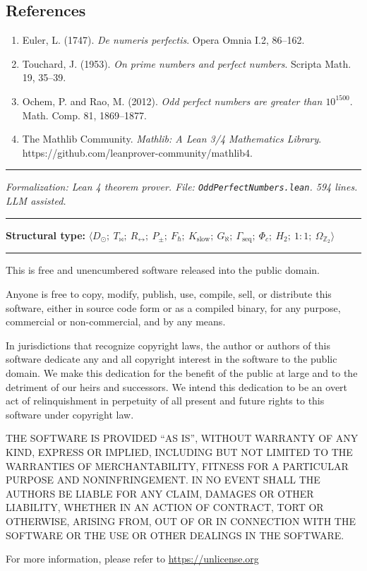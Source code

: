 \documentclass[11pt,a4paper]{article}
\begin{document}
\subsection{References}

\begin{enumerate}
    \item Euler, L. (1747). \emph{De numeris perfectis}. Opera Omnia I.2, 86--162.
    \item Touchard, J. (1953). \emph{On prime numbers and perfect numbers}. Scripta Math. 19, 35--39.
    \item Ochem, P. and Rao, M. (2012). \emph{Odd perfect numbers are greater than $10^{1500}$}. Math. Comp. 81, 1869--1877.
    \item The Mathlib Community. \emph{Mathlib: A Lean 3/4 Mathematics Library}. https://github.com/leanprover-community/mathlib4.
\end{enumerate}

\begin{center}
\rule{0.5\textwidth}{0.4pt}
\end{center}

\emph{Formalization: Lean 4 theorem prover. File: \texttt{OddPerfectNumbers.lean}. 594 lines. LLM assisted.}

\begin{center}
\rule{0.5\textwidth}{0.4pt}
\end{center}

\textbf{Structural type:} $\langle D_{\odot};\ T_{\bowtie};\ R_{\leftrightarrow};\ P_{\pm};\ F_{\hbar};\ K_\text{slow};\ G_{\aleph};\ \Gamma_\text{seq};\ \Phi_c;\ H_2;\ 1{:}1;\ \Omega_{\mathbb{Z}_2} \rangle$


\begin{center}
\rule{0.5\textwidth}{0.4pt}
\end{center}

{\small\noindent
This is free and unencumbered software released into the public domain.

Anyone is free to copy, modify, publish, use, compile, sell, or distribute this software, either in source code form or as a compiled binary, for any purpose, commercial or non-commercial, and by any means.

In jurisdictions that recognize copyright laws, the author or authors of this software dedicate any and all copyright interest in the software to the public domain. We make this dedication for the benefit of the public at large and to the detriment of our heirs and successors. We intend this dedication to be an overt act of relinquishment in perpetuity of all present and future rights to this software under copyright law.

THE SOFTWARE IS PROVIDED ``AS IS'', WITHOUT WARRANTY OF ANY KIND, EXPRESS OR IMPLIED, INCLUDING BUT NOT LIMITED TO THE WARRANTIES OF MERCHANTABILITY, FITNESS FOR A PARTICULAR PURPOSE AND NONINFRINGEMENT. IN NO EVENT SHALL THE AUTHORS BE LIABLE FOR ANY CLAIM, DAMAGES OR OTHER LIABILITY, WHETHER IN AN ACTION OF CONTRACT, TORT OR OTHERWISE, ARISING FROM, OUT OF OR IN CONNECTION WITH THE SOFTWARE OR THE USE OR OTHER DEALINGS IN THE SOFTWARE.

For more information, please refer to \url{https://unlicense.org}
}
\end{document}
